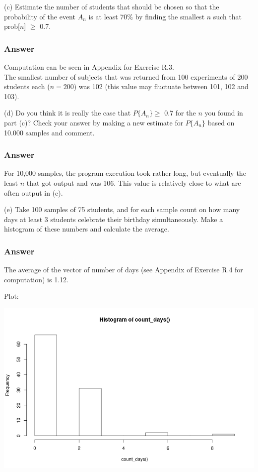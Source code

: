 \documentclass[12pt]{article}
\begin{document}
(c) Estimate the number of students that should be chosen so that the probability of the event $A_{n}$ is at least 70\% by finding the smallest $n$ such that prob[$n$] $\geq$ 0.7.\\
\subsubsection*{Answer}
Computation can be seen in Appendix for Exercise R.3.\\
The smallest number of subjects that was returned from 100 experiments of 200 students each ($n=200$) was 102 (this value may fluctuate between 101, 102 and 103).

(d) Do you think it is really the case that $P\{A_{n}\} \geq$ 0.7 for the $n$ you found in part (c)? Check your answer by making a new estimate for $P\{A_{n}\}$ based on 10.000 samples and comment.
\subsubsection*{Answer}
For 10,000 samples, the program execution took rather long, but eventually the least $n$ that got output and was 106. This value is relatively close to what are often output in (c).

(e) Take 100 samples of 75 students, and for each sample count on how many days at least 3 students celebrate their birthday simultaneously. Make a histogram of these numbers and calculate the average.
\subsubsection*{Answer}
The average of the vector of number of days (see Appendix of Exercise R.4 for computation) is 1.12.

Plot:

\includegraphics[width=\textwidth]{Ex3Plot2}
\end{document}
